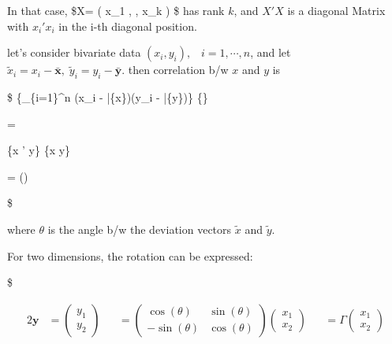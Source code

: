\documentclass[
]{book}
\begin{document}
{{{In that case, \$X= \left( \pmb x\_1 , \cdots, \pmb x\_k \right) \$ has rank \(k\), and \(X'X\) is a diagonal Matrix with \(x_i ' x_i\) in the i-th diagonal position.

let's consider bivariate data \((x_i , y_i), \; \; \; i= 1, \cdots, n\), and let \(\tilde x_i = x_i - \bar {\pmb x}, \; \tilde y_i = y_i - \bar {\pmb y}\). then correlation b/w \(x\) and \(y\) is

\$
\dfrac
\{\sum\_\{i=1\}\^{}n (x\_i - \bar \{\pmb x\})(y\_i - \bar \{\pmb y\})\}
\{\sqrt{\left[ \sum_{i=1}^n (x_i - \bar {\pmb x})^2 \right] \ast \left[ \sum_{i=1}^n(y_i - \bar {\pmb y})^2 \right]}\}

=

\dfrac

\{\tilde x ' \tilde y\}
\{\Vert \tilde x \Vert \ast \Vert \tilde y\Vert\}

= \cos(\theta)

\$

where \(\theta\) is the angle b/w the deviation vectors \({\tilde x}\) and \({\tilde y}\).

For two dimensions, the rotation can be expressed:

\$

\begin{alignat}{2}

\pmb y &= \begin{pmatrix} y_1 \\ y_2 \end{pmatrix}


&&=


\begin{pmatrix} 

\cos(\theta) & \sin(\theta) \\

-\sin(\theta) & \cos(\theta) 


\end{pmatrix}




\begin{pmatrix} 

x_1 \\ x_2 

\end{pmatrix}



&& = \Gamma 

\begin{pmatrix} 

x_1 \\ x_2 


\end{pmatrix}
\end{alignat}}}}
\end{document}
